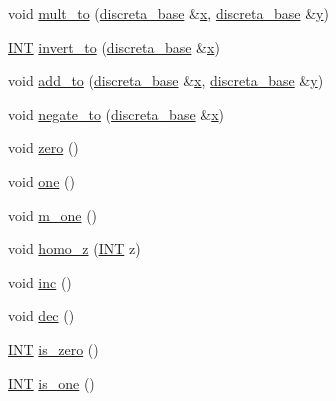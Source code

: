 \begin{DoxyCompactItemize}
\item 
void \mbox{\hyperlink{classlonginteger_a1afdab43a82be7dfd40ff41da28735d2}{mult\+\_\+to}} (\mbox{\hyperlink{classdiscreta__base}{discreta\+\_\+base}} \&\mbox{\hyperlink{alphabet2_8_c_a6150e0515f7202e2fb518f7206ed97dc}{x}}, \mbox{\hyperlink{classdiscreta__base}{discreta\+\_\+base}} \&\mbox{\hyperlink{alphabet2_8_c_a0a2f84ed7838f07779ae24c5a9086d33}{y}})
\item 
\mbox{\hyperlink{galois_8h_a09fddde158a3a20bd2dcadb609de11dc}{I\+NT}} \mbox{\hyperlink{classlonginteger_ab60c9e3b2f28caf83f3b13d6f3a9ec54}{invert\+\_\+to}} (\mbox{\hyperlink{classdiscreta__base}{discreta\+\_\+base}} \&\mbox{\hyperlink{alphabet2_8_c_a6150e0515f7202e2fb518f7206ed97dc}{x}})
\item 
void \mbox{\hyperlink{classlonginteger_a457c74224b83d9fbfc904a391baab7ed}{add\+\_\+to}} (\mbox{\hyperlink{classdiscreta__base}{discreta\+\_\+base}} \&\mbox{\hyperlink{alphabet2_8_c_a6150e0515f7202e2fb518f7206ed97dc}{x}}, \mbox{\hyperlink{classdiscreta__base}{discreta\+\_\+base}} \&\mbox{\hyperlink{alphabet2_8_c_a0a2f84ed7838f07779ae24c5a9086d33}{y}})
\item 
void \mbox{\hyperlink{classlonginteger_a1de6a5663bb80562dee0e6ca1a808ff1}{negate\+\_\+to}} (\mbox{\hyperlink{classdiscreta__base}{discreta\+\_\+base}} \&\mbox{\hyperlink{alphabet2_8_c_a6150e0515f7202e2fb518f7206ed97dc}{x}})
\item 
void \mbox{\hyperlink{classlonginteger_a082d0c05f45c21f188e17a8463a42800}{zero}} ()
\item 
void \mbox{\hyperlink{classlonginteger_ae1b9507b0d658768ceb278659e2adf1a}{one}} ()
\item 
void \mbox{\hyperlink{classlonginteger_a4a8280b414e6dc2ed917f0f70d778e05}{m\+\_\+one}} ()
\item 
void \mbox{\hyperlink{classlonginteger_a986e829bf35eca2b9f24b1b3766d5677}{homo\+\_\+z}} (\mbox{\hyperlink{galois_8h_a09fddde158a3a20bd2dcadb609de11dc}{I\+NT}} z)
\item 
void \mbox{\hyperlink{classlonginteger_aac69c9779c9fed275a1cbae4314438e5}{inc}} ()
\item 
void \mbox{\hyperlink{classlonginteger_a99be1d0bdcae0dcce47d8d0a09612edf}{dec}} ()
\item 
\mbox{\hyperlink{galois_8h_a09fddde158a3a20bd2dcadb609de11dc}{I\+NT}} \mbox{\hyperlink{classlonginteger_aa40fbd6c28e40a7a19cb29b8999afbc0}{is\+\_\+zero}} ()
\item 
\mbox{\hyperlink{galois_8h_a09fddde158a3a20bd2dcadb609de11dc}{I\+NT}} \mbox{\hyperlink{classlonginteger_a2e169e4ac876ac8694af28468fdfd060}{is\+\_\+one}} ()

\end{DoxyCompactItemize}
